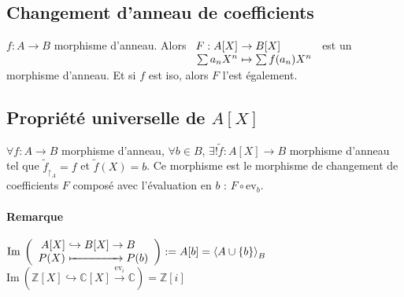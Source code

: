 \documentclass[reqno,a4paper,10pt]{report}
\newcommand{\mt}[1]{\widetilde{#1}} %
\newcommand{\gen}[1]{\left\langle #1 \right\rangle} %
\newcommand{\set}[1]{\left\lbrace #1 \right\rbrace} %
\newcommand{\im}{\mathrm{Im}\:} %
\newcommand{\IZ}{\ensuremath{\mathbb{Z}}\xspace} %
\newcommand{\IC}{\ensuremath{\mathbb{C}}\xspace} %
\newcommand{\inj}{\hookrightarrow}
\newcommand{\rstrct}[2]{{#1}_{\upharpoonright_{#2}}} %
\newcommand{\pfootnote}[1]{\up{(}\footnote{#1}\up{)}} %
\newcommand{\ev}[1]{\mathrm{ev}_{ #1 }}
\begin{document}
\subsection{Changement d'anneau de coefficients}
$f:A \to B$ morphisme d'anneau. Alors $
\begin{array}[t]{r@{\ }l}
  F: A[X] &\to B[X]\\
  \sum a_n X^n &\mapsto \sum f(a_n) X^n
\end{array}$ est un morphisme d'anneau. Et si $f$ est iso, alors $F$ l'est
également.

\subsection{Propriété universelle de $A[X]$}
$\forall f : A \to B$ morphisme d'anneau, $\forall b \in B$, $\exists !
\mt{f} : A[X] \to B$ morphisme d'anneau tel que $\rstrct{\mt{f}}{A} = f$ et
$\mt{f}(X)=b$. Ce morphisme est le morphisme de changement de coefficients $F$
composé avec l'évaluation en $b$ : $F\circ \ev{b}$.
\begin{comment}
  \pfootnote{Preuve 07/10/09 p1 verso}
\end{comment}

\paragraph{Remarque} $\im \left( \begin{array}{r@{\ }l}
  A[X] &\inj B[X] \to B \\
  P(X) &\xmapsto{\hphantom{\!\textstyle \!\inj B[X] \to\!\!}}  P(b)
\end{array}\right):=A[b]=\gen{A\cup\set{b}}_B$\\
$\im\left( \IZ[X] \inj \IC[X] \xrightarrow{\ev i} \IC\right)=\IZ[i]$
\end{document}
